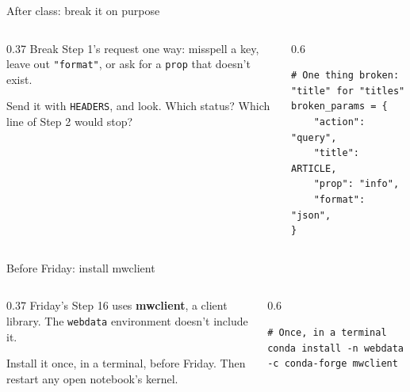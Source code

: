 \documentclass[9pt,aspectratio=169]{beamer}
\begin{document}
\begin{frame}[fragile]{After class: break it on purpose}
    \begin{columns}[T]
        \begin{column}{0.37\textwidth}
            Break Step 1's request one way: misspell a key, leave out \texttt{"format"}, or ask for a \texttt{prop} that doesn't exist.

            \medskip
            Send it with \texttt{HEADERS}, and look. Which status? Which line of Step 2 would stop?
        \end{column}
        \begin{column}{0.6\textwidth}
\begin{lstlisting}
# One thing broken: "title" for "titles"
broken_params = {
    "action": "query",
    "title": ARTICLE,
    "prop": "info",
    "format": "json",
}
\end{lstlisting}
        \end{column}
    \end{columns}
\end{frame}

\begin{frame}[fragile]{Before Friday: install mwclient}
    \begin{columns}[T]
        \begin{column}{0.37\textwidth}
            Friday's Step 16 uses \textbf{mwclient}, a client library. The \texttt{webdata} environment doesn't include it.

            \medskip
            Install it once, in a terminal, before Friday. Then restart any open notebook's kernel.
        \end{column}
        \begin{column}{0.6\textwidth}
\begin{lstlisting}
# Once, in a terminal
conda install -n webdata -c conda-forge mwclient
\end{lstlisting}
        \end{column}
    \end{columns}
\end{frame}
\end{document}
